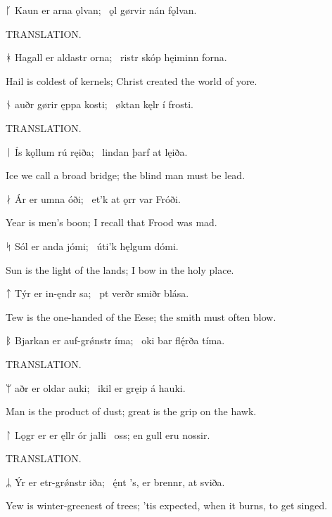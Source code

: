 \bvg\bva ᚴ Kaun er arna ǫlvan; \hld\ ǫl gørvir nán fǫlvan.\eva

\bvb TRANSLATION.\evb\evg


\bvg\bva ᚼ Hagall er aldastr orna; \hld\ ristr skóp hęiminn forna.\eva

\bvb Hail is coldest of kernels; Christ created the world of yore.\evb\evg


\bvg\bva ᚾ auðr gørir ęppa kosti; \hld\ øktan kęlr í frosti.\eva

\bvb TRANSLATION.\evb\evg


\bvg\bva ᛁ Ís kǫllum rú ręiða; \hld\ lindan þarf at lęiða.\eva

\bvb Ice we call a broad bridge; the blind man must be lead.\evb\evg


\bvg\bva ᛅ Ár er umna óði; \hld\ et’k at ǫrr var Fróði.\eva

\bvb Year is men’s boon; I recall that Frood was mad.\evb\evg


\bvg\bva ᛋ Sól er anda jómi; \hld\ úti’k hęlgum dómi.\eva

\bvb Sun is the light of the lands; I bow in the holy place.\evb\evg


\bvg\bva ᛏ Týr er in-ęndr sa; \hld\ pt verðr smiðr blása.\eva

\bvb Tew is the one-handed of the Eese; the smith must often blow.\evb\evg


\bvg\bva ᛒ Bjarkan er auf-grǿnstr íma; \hld\ oki bar flę́rða tíma.\eva

\bvb TRANSLATION.\evb\evg


\bvg\bva ᛘ aðr er oldar auki; \hld\ ikil er gręip á hauki.\eva

\bvb Man is the product of dust; great is the grip on the hawk.\evb\evg


\bvg\bva ᛚ Lǫgr er er ęllr ór jalli \hld\ oss; en gull eru nossir.\eva

\bvb TRANSLATION.\evb\evg


\bvg\bva ᛦ Ýr er etr-grǿnstr iða; \hld\ ę́nt ’s, er brennr, at sviða. \eva

\bvb Yew is winter-greenest of trees; ’tis expected, when it burns, to get singed.\evb\evg

\sectionline
